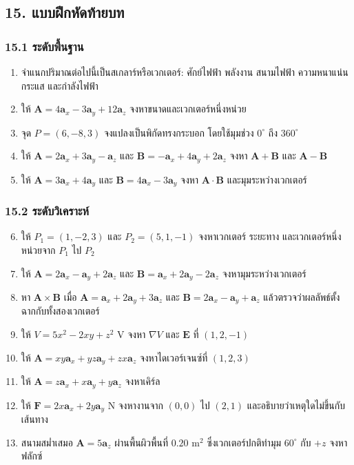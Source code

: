 \subsection{15. แบบฝึกหัดท้ายบท}

\subsubsection{15.1 ระดับพื้นฐาน}

\begin{enumerate}
\item จำแนกปริมาณต่อไปนี้เป็นสเกลาร์หรือเวกเตอร์: ศักย์ไฟฟ้า พลังงาน สนามไฟฟ้า ความหนาแน่นกระแส และกำลังไฟฟ้า
\item ให้ \(\mathbf{A}=4\mathbf{a}_x-3\mathbf{a}_y+12\mathbf{a}_z\) จงหาขนาดและเวกเตอร์หนึ่งหน่วย
\item จุด \(P=(6,-8,3)\) จงแปลงเป็นพิกัดทรงกระบอก โดยใช้มุมช่วง \(0^\circ\) ถึง \(360^\circ\)
\item ให้ \(\mathbf{A}=2\mathbf{a}_x+3\mathbf{a}_y-\mathbf{a}_z\) และ \(\mathbf{B}=-\mathbf{a}_x+4\mathbf{a}_y+2\mathbf{a}_z\) จงหา \(\mathbf{A}+\mathbf{B}\) และ \(\mathbf{A}-\mathbf{B}\)
\item ให้ \(\mathbf{A}=3\mathbf{a}_x+4\mathbf{a}_y\) และ \(\mathbf{B}=4\mathbf{a}_x-3\mathbf{a}_y\) จงหา \(\mathbf{A}\cdot\mathbf{B}\) และมุมระหว่างเวกเตอร์
\end{enumerate}

\subsubsection{15.2 ระดับวิเคราะห์}

\begin{enumerate}
\setcounter{enumi}{5}
\item ให้ \(P_1=(1,-2,3)\) และ \(P_2=(5,1,-1)\) จงหาเวกเตอร์ ระยะทาง และเวกเตอร์หนึ่งหน่วยจาก \(P_1\) ไป \(P_2\)
\item ให้ \(\mathbf{A}=2\mathbf{a}_x-\mathbf{a}_y+2\mathbf{a}_z\) และ \(\mathbf{B}=\mathbf{a}_x+2\mathbf{a}_y-2\mathbf{a}_z\) จงหามุมระหว่างเวกเตอร์
\item หา \(\mathbf{A}\times\mathbf{B}\) เมื่อ \(\mathbf{A}=\mathbf{a}_x+2\mathbf{a}_y+3\mathbf{a}_z\) และ \(\mathbf{B}=2\mathbf{a}_x-\mathbf{a}_y+\mathbf{a}_z\) แล้วตรวจว่าผลลัพธ์ตั้งฉากกับทั้งสองเวกเตอร์
\item ให้ \(V=5x^2-2xy+z^2\) V จงหา \(\nabla V\) และ \(\mathbf{E}\) ที่ \((1,2,-1)\)
\item ให้ \(\mathbf{A}=xy\mathbf{a}_x+yz\mathbf{a}_y+zx\mathbf{a}_z\) จงหาไดเวอร์เจนซ์ที่ \((1,2,3)\)
\item ให้ \(\mathbf{A}=z\mathbf{a}_x+x\mathbf{a}_y+y\mathbf{a}_z\) จงหาเคิร์ล
\item ให้ \(\mathbf{F}=2x\mathbf{a}_x+2y\mathbf{a}_y\) N จงหางานจาก \((0,0)\) ไป \((2,1)\) และอธิบายว่าเหตุใดไม่ขึ้นกับเส้นทาง
\item สนามสม่ำเสมอ \(\mathbf{A}=5\mathbf{a}_z\) ผ่านพื้นผิวพื้นที่ \(0.20\) m\(^2\) ซึ่งเวกเตอร์ปกติทำมุม \(60^\circ\) กับ \(+z\) จงหาฟลักซ์
\end{enumerate}

